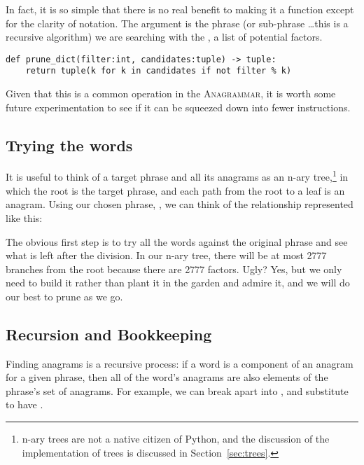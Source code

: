 \documentclass[letterpaper, 11pt]{article}
\providecommand{\anagrammar}{A\textsc{nagrammar}\xspace}
\begin{document}
In fact, it is so simple that there is no real benefit to making
it a function except for the clarity of notation. The 
argument is the phrase (or sub-phrase \ldots this is a recursive
algorithm) we are searching with the , a list
of potential factors.

\begin{verbatim}
def prune_dict(filter:int, candidates:tuple) -> tuple:
    return tuple(k for k in candidates if not filter % k)
\end{verbatim}

Given that this is a common operation in the \anagrammar, it is 
worth some future experimentation to see if it can be squeezed down
into fewer instructions.

\subsection{Trying the words}

It is useful to think of a target phrase and all its anagrams as an
n-ary tree,\footnote{n-ary trees are not a native citizen of Python,
and the discussion of the implementation of trees is discussed in 
Section~\ref{sec:trees}.} in which the root is the target phrase, and each path 
from the root to a leaf is an anagram. Using our chosen phrase,
, we can think of the relationship represented
like this:



The obvious first step is to try all the words against the original
phrase and see what is left after the division. In our n-ary tree,
there will be at most 2777 branches from the root because there are
2777 factors. Ugly? Yes, but we only need to build it rather than
plant it in the garden and admire it, and we will do our best to
prune as we go.

\subsection{Recursion and Bookkeeping}

Finding anagrams is a recursive process: if a word is a component
of an anagram for a given phrase, then all of the word's anagrams
are also elements of the phrase's set of anagrams. For example, we
can break apart  into , and substitute
to have .
\end{document}
